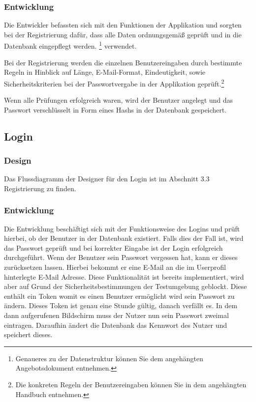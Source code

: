 \documentclass[12pt,a4paper]{article}
\begin{document}
\subsubsection*{Entwicklung}
Die Entwickler befassten sich mit den Funktionen der Applikation und sorgten bei der Registrierung dafür, dass alle Daten ordnungsgemäß geprüft und in die Datenbank eingepflegt werden.
\footnote{Genaueres zu der Datenstruktur können Sie dem angehängten Angebotsdokument entnehmen.} verwendet.

Bei der Registrierung werden die einzelnen Benutzereingaben durch bestimmte Regeln in Hinblick auf Länge, E-Mail-Format, Eindeutigkeit, sowie Sicherheitskriterien bei der Passwortvergabe in der Applikation geprüft.\footnote{Die konkreten Regeln der Benutzereingaben können Sie in dem angehängten Handbuch entnehmen.}

Wenn alle Prüfungen erfolgreich waren, wird der Benutzer angelegt und das Passwort verschlüsselt in Form eines Hashs in der Datenbank gespeichert.
\subsection{Login}
\subsubsection*{Design}
Das Flussdiagramm der Designer für den Login ist im Abschnitt 3.3 Registrierung zu finden. 
\subsubsection*{Entwicklung}
Die Entwicklung beschäftigt sich mit der Funktionsweise des Logins und prüft hierbei, ob der Benutzer in der Datenbank existiert. Falls dies der Fall ist, wird das Passwort geprüft und bei korrekter Eingabe ist der Login erfolgreich durchgeführt.
Wenn der Benutzer sein Passwort vergessen hat, kann er dieses zurücksetzen lassen. Hierbei bekommt er eine E-Mail an die im Userprofil hinterlegte E-Mail Adresse. Diese Funktionalität ist bereits implementiert, wird aber auf Grund der Sicherheitsbestimmungen der Testumgebung geblockt. Diese enthält ein Token womit es einen Benutzer ermöglicht wird sein Passwort zu ändern. Dieses Token ist genau eine Stunde gültig, danach verfällt es. 
In dem dann aufgerufenen Bildschirm muss der Nutzer nun sein Passwort zweimal eintragen. Daraufhin ändert die Datenbank das Kennwort des Nutzer und speichert dieses.
\end{document}
